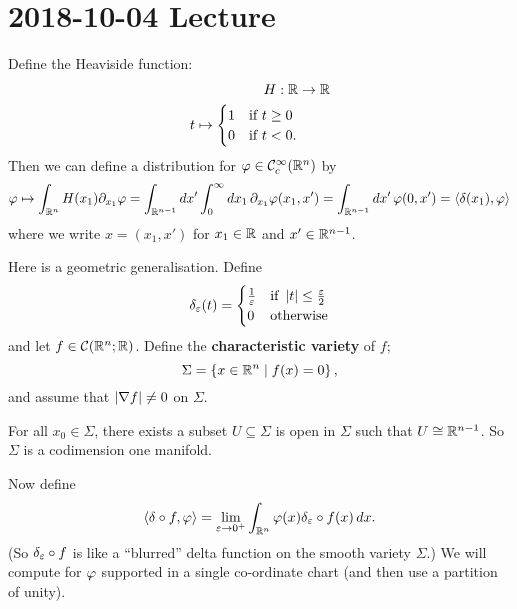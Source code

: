 \section{2018-10-04 Lecture}

\begin{exam}
  \lv
  \begin{enum}
    \io
    Define the Heaviside function:
    \begin{align*}
      H: \mathbb{R} &\to \mathbb{R} \\
      t \mapsto
      \begin{cases}
	1 & \text{if }t\geq0 \\
	0 & \text{if }t<0.
      \end{cases}
    \end{align*}
    Then we can define a distribution for $\varphi\in\mathcal{C}_c^\infty(\mathbb{R}^n)$ by
    \[ \varphi \mapsto \int_{\mathbb{R}^n} H(x_1) \partial_{x_1} \varphi = \int_{\mathbb{R}^{n-1}} dx' \int_0^\infty dx_1 \, \partial_{x_1} \varphi(x_1,x') = \int_{\mathbb{R}^{n-1}} dx' \, \varphi(0,x') = {\left\langle \delta(x_1),\varphi \right\rangle} \]
    where we write $x=(x_1,x')$ for $x_1\in\mathbb{R}$ and $x'\in\mathbb{R}^{n-1}$.

    \io
    Here is a geometric generalisation.
    Define
    \begin{equation*}
      \delta_\varepsilon(t)=
      \begin{cases}
	\frac1{\varepsilon} &\text{if }\left\lvert t \right\rvert\leq\frac{\varepsilon}2 \\
	0 &\text{otherwise}
      \end{cases}
    \end{equation*}
    and let $f\in\mathcal{C}(\mathbb{R}^n;\mathbb{R})$.
    Define the \textbf{characteristic variety} of $f$;
    \[ \Sigma=\left\{ x\in\mathbb{R}^n \mid f(x)=0 \right\}, \]
    and assume that $\left\lvert \nabla f \right\rvert\neq0$ on $\Sigma$.

    \begin{exer}
      For all $x_0\in\Sigma$, there exists a subset $U\subseteq\Sigma$ is open in $\Sigma$ such that $U\cong\mathbb{R}^{n-1}$.
      So $\Sigma$ is a codimension one manifold.
    \end{exer}

    Now define
    \[ {\left\langle \delta\circ f,\varphi \right\rangle} = \lim_{\varepsilon\to0^+} \int_{\mathbb{R}^n} \varphi(x) \delta_\varepsilon\circ f(x) \, dx. \]
    (So $\delta_\varepsilon\circ f$ is like a ``blurred'' delta function on the smooth variety $\Sigma$.)
    We will compute for $\varphi$ supported in a single co-ordinate chart (and then use a partition of unity).


\end{enum}
\end{exam}
